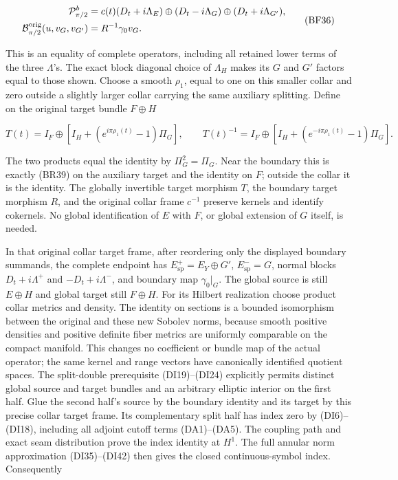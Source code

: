 \documentclass[
  11pt,
]{article}
\begin{document}
\[
 \begin{split}
 \mathcal P_{\pi/2}^{b}
 &=c(t)(D_t+i\Lambda_E)
       \oplus(D_t-i\Lambda_G)\oplus(D_t+i\Lambda_{G'}),\\
 \mathcal B_{\pi/2}^{\rm orig}(u,v_G,v_{G'})
 &=R^{-1}\gamma_0v_G.
 \end{split}
 \tag{BF36}
\]

This is an equality of complete operators, including all retained lower
terms of the three \(\Lambda\)'s. The exact block diagonal choice of
\(\Lambda_H\) makes its \(G\) and \(G'\) factors equal to those shown.
Choose a smooth \(\rho_1\), equal to one on this smaller collar and zero
outside a slightly larger collar carrying the same auxiliary splitting.
Define on the original target bundle \(F\oplus H\)

\[
 T(t)=I_F\oplus
     \left[I_H+(e^{i\pi\rho_1(t)}-1)\Pi_G\right],
 \qquad
 T(t)^{-1}=I_F\oplus
     \left[I_H+(e^{-i\pi\rho_1(t)}-1)\Pi_G\right].
 \tag{BF37}
\]

The two products equal the identity by \(\Pi_G^2=\Pi_G\). Near the
boundary this is exactly (BR39) on the auxiliary target and the identity
on \(F\); outside the collar it is the identity. The globally invertible
target morphism \(T\), the boundary target morphism \(R\), and the
original collar frame \(c^{-1}\) preserve kernels and identify
cokernels. No global identification of \(E\) with \(F\), or global
extension of \(G\) itself, is needed.

In that original collar target frame, after reordering only the
displayed boundary summands, the complete endpoint has
\(E_{\mathrm{sp}}^+=E_Y\oplus G'\), \(E_{\mathrm{sp}}^-=G\), normal
blocks \(D_t+i\Lambda^+\) and \(-D_t+i\Lambda^-\), and boundary map
\(\gamma_0|_{G}\). The global source is still \(E\oplus H\) and global
target still \(F\oplus H\). For its Hilbert realization choose product
collar metrics and density. The identity on sections is a bounded
isomorphism between the original and these new Sobolev norms, because
smooth positive densities and positive definite fiber metrics are
uniformly comparable on the compact manifold. This changes no
coefficient or bundle map of the actual operator; the same kernel and
range vectors have canonically identified quotient spaces. The
split-double prerequisite (DI19)--(DI24) explicitly permits distinct
global source and target bundles and an arbitrary elliptic interior on
the first half. Glue the second half's source by the boundary identity
and its target by this precise collar target frame. Its complementary
split half has index zero by (DI6)--(DI18), including all adjoint cutoff
terms (DA1)--(DA5). The coupling path and exact seam distribution prove
the index identity at \(H^1\). The full annular norm approximation
(DI35)--(DI42) then gives the closed continuous-symbol index.
Consequently
\end{document}
